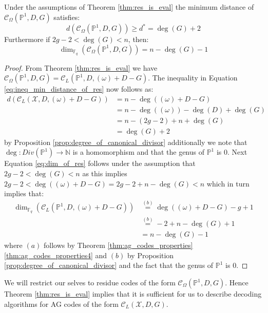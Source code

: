 \begin{corollary}\label{cor:parameters_of_res}
  Under the assumptions of Theorem \ref{thm:res_is_eval} the minimum distance of $\mathcal{C}_{\Omega}(\mathbb{P}^1, D, G)$ satisfies:
  \begin{equation}\label{eq:ineq_min_distance_of_res}
    d(\mathcal{C}_{\Omega}(\mathbb{P}^1, D, G)) \geq d^{*} = \deg(G) + 2
  \end{equation}
  Furthermore if $2g - 2 < \deg(G) < n$, then:
  \begin{equation}\label{eq:dim_of_res}
    \dim_{\mathbb{F}_q}(\mathcal{C}_{\Omega}(\mathbb{P}^1, D, G)) = n - \deg(G) - 1
  \end{equation}
\end{corollary}
\begin{proof}
  From Theorem \ref{thm:res_is_eval} we have $\mathcal{C}_\Omega(\mathbb{P}^1, D, G) = \mathcal{C}_L(\mathbb{P}^1, D, (\omega) + D - G)$. The inequality in Equation \eqref{eq:ineq_min_distance_of_res} now follows as:
  \begin{align*}
    d(\mathcal{C}_L(\mathcal{X}, D, (\omega) + D - G)) &= n - \deg((\omega) + D - G)\\ &= n - \deg((\omega)) - \deg(D) + \deg(G) \\ &= n - (2g - 2) + n + \deg(G) \\ &= \deg(G) + 2
  \end{align*}
  by Proposition \ref{prop:degree_of_canonical_divisor} additionally we note that $\deg: Div(\mathbb{P}^1) \to \mathbb{N}$ is a homomorphism and that the genus of $\mathbb{P}^1$ is $0$. Next Equation \eqref{eq:dim_of_res} follows under the assumption that $2g - 2 < \deg(G) < n$ as this implies $2g - 2 < \deg((\omega) + D - G) = 2g - 2 + n - \deg(G) < n$ which in turn implies that:
  \begin{align*}
    \dim_{\mathbb{F}_q}(\mathcal{C}_L(\mathbb{P}^1, D, (\omega) + D - G)) &\stackrel{(b)}{=} \deg((\omega) + D - G) - g + 1 \\ &\stackrel{(b)}{=} - 2 + n - \deg(G) + 1 \\ &=  n - \deg(G) - 1
  \end{align*}
  where $(a)$ follows by Theorem \ref{thm:ag_codes_properties}\ref{thm:ag_codes_properties4} and $(b)$ by Proposition \ref{prop:degree_of_canonical_divisor} and the fact that the genus of $\mathbb{P}^1$ is $0$.
\end{proof}


\begin{remark}
  We will restrict our selves to residue codes of the form $\mathcal{C}_{\Omega}(\mathbb{P}^1, D, G)$.
  Hence Theorem \ref{thm:res_is_eval} implies that it is sufficient for us to describe decoding algorithms for AG codes of the form $\mathcal{C}_L(\mathcal{X}, D, G)$.
\end{remark}


